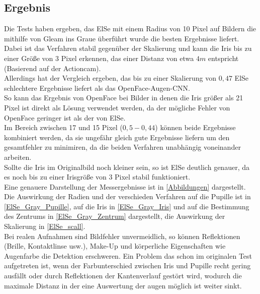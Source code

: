 \subsection{Ergebnis}
Die Tests haben ergeben, das ElSe mit einem Radius von 10 Pixel auf Bildern die mithilfe von Gleam ins Graue überführt wurde die besten Ergebnisse liefert. Dabei ist das Verfahren stabil gegenüber der Skalierung und kann die Iris bis zu einer Größe von 3 Pixel erkennen, das einer Distanz von etwa $4m$ entspricht (Basierend auf der Actioncam).\\
Allerdings hat der Vergleich ergeben, das bis zu einer Skalierung von $0,47$ ElSe schlechtere Ergebnisse liefert als das OpenFace-Augen-CNN.\\
So kann das Ergebnis von OpenFace bei Bilder in denen die Iris größer als 21 Pixel ist direkt als Lösung verwendet werden, da der mögliche Fehler von OpenFace geringer ist als der von ElSe.\\
Im Bereich zwischen 17 und 15 Pixel ($0,5-0,44$) können beide Ergebnisse kombiniert werden, da sie ungefähr gleich gute Ergebnisse liefern um den gesamtfehler zu minimiren, da die beiden Verfahren unabhängig voneinander arbeiten.\\
Sollte die Iris im Originalbild noch kleiner sein, so ist ElSe deutlich genauer, da es noch bis zu einer Irisgröße von 3 Pixel stabil funktioniert.\\
Eine genauere Darstellung der Messergebnisse ist in \autoref{Abbildungen} dargestellt. Die Auswirkung der Radien und der verschieden Verfahren auf die Pupille ist in \autoref{ElSe_Gray_Pupille}, auf die Iris in \autoref{ElSe_Gray_Iris} und auf die Bestimmung des Zentrums in \autoref{ElSe_Gray_Zentrum} dargestellt, die Auswirkung der Skalierung in \autoref{ElSe_scall}.\\
Bei realen Aufnahmen sind Bildfehler unvermeidlich, so können Reflektionen (Brille, Kontaktlinse usw.), Make-Up und körperliche Eigenschaften wie Augenfarbe die Detektion erschweren. Ein Problem das schon im originalen Test \cite{ElSe} aufgetreten ist, wenn der Farbunterschied zwischen Iris und Pupille recht gering ausfällt oder durch Reflektionen der Kantenverlauf gestört wird, wodurch die maximale Distanz in der eine Auswertung der augen möglich ist weiter sinkt.